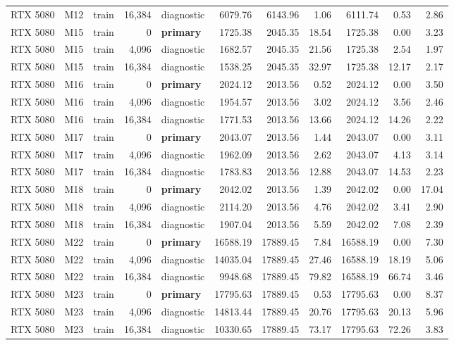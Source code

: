 \documentclass[10pt]{article}
\begin{document}
\begin{landscape}
\begin{longtable}{@{}l l l r l r r r r r r@{}}
RTX 5080 & M12 & train & 16,384 & diagnostic & 6079.76 & 6143.96 & 1.06 & 6111.74 & 0.53 & 2.86 \\
RTX 5080 & M15 & train & 0 & \textbf{primary} & 1725.38 & 2045.35 & 18.54 & 1725.38 & 0.00 & 3.23 \\
RTX 5080 & M15 & train & 4,096 & diagnostic & 1682.57 & 2045.35 & 21.56 & 1725.38 & 2.54 & 1.97 \\
RTX 5080 & M15 & train & 16,384 & diagnostic & 1538.25 & 2045.35 & 32.97 & 1725.38 & 12.17 & 2.17 \\
RTX 5080 & M16 & train & 0 & \textbf{primary} & 2024.12 & 2013.56 & 0.52 & 2024.12 & 0.00 & 3.50 \\
RTX 5080 & M16 & train & 4,096 & diagnostic & 1954.57 & 2013.56 & 3.02 & 2024.12 & 3.56 & 2.46 \\
RTX 5080 & M16 & train & 16,384 & diagnostic & 1771.53 & 2013.56 & 13.66 & 2024.12 & 14.26 & 2.22 \\
RTX 5080 & M17 & train & 0 & \textbf{primary} & 2043.07 & 2013.56 & 1.44 & 2043.07 & 0.00 & 3.11 \\
RTX 5080 & M17 & train & 4,096 & diagnostic & 1962.09 & 2013.56 & 2.62 & 2043.07 & 4.13 & 3.14 \\
RTX 5080 & M17 & train & 16,384 & diagnostic & 1783.83 & 2013.56 & 12.88 & 2043.07 & 14.53 & 2.23 \\
RTX 5080 & M18 & train & 0 & \textbf{primary} & 2042.02 & 2013.56 & 1.39 & 2042.02 & 0.00 & 17.04 \\
RTX 5080 & M18 & train & 4,096 & diagnostic & 2114.20 & 2013.56 & 4.76 & 2042.02 & 3.41 & 2.90 \\
RTX 5080 & M18 & train & 16,384 & diagnostic & 1907.04 & 2013.56 & 5.59 & 2042.02 & 7.08 & 2.39 \\
RTX 5080 & M22 & train & 0 & \textbf{primary} & 16588.19 & 17889.45 & 7.84 & 16588.19 & 0.00 & 7.30 \\
RTX 5080 & M22 & train & 4,096 & diagnostic & 14035.04 & 17889.45 & 27.46 & 16588.19 & 18.19 & 5.06 \\
RTX 5080 & M22 & train & 16,384 & diagnostic & 9948.68 & 17889.45 & 79.82 & 16588.19 & 66.74 & 3.46 \\
RTX 5080 & M23 & train & 0 & \textbf{primary} & 17795.63 & 17889.45 & 0.53 & 17795.63 & 0.00 & 8.37 \\
RTX 5080 & M23 & train & 4,096 & diagnostic & 14813.44 & 17889.45 & 20.76 & 17795.63 & 20.13 & 5.96 \\
RTX 5080 & M23 & train & 16,384 & diagnostic & 10330.65 & 17889.45 & 73.17 & 17795.63 & 72.26 & 3.83 \\

\end{longtable}
\end{landscape}
\end{document}
